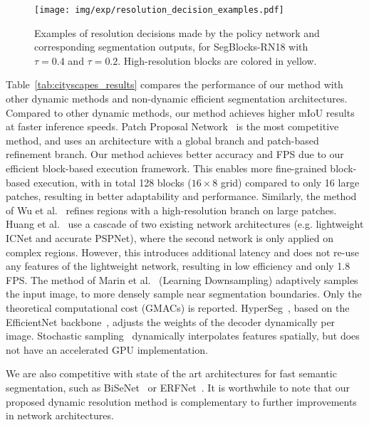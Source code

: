 \begin{figure*}[tb]
\centering
\texttt{[image: img/exp/resolution\_decision\_examples.pdf]}
\caption{Examples of resolution decisions made by the policy network and corresponding segmentation outputs, for SegBlocks-RN18 with $\tau = 0.4$ and $\tau = 0.2$. High-resolution blocks are colored in yellow. 
}
\label{fig:cityscapes_policy_examples}
\end{figure*}


Table~\ref{tab:cityscapes_results} compares the performance of our method with other dynamic methods and non-dynamic efficient segmentation architectures. Compared to other dynamic methods, our method achieves higher mIoU results at faster inference speeds. Patch Proposal Network~\cite{wu_patch_2020} is the most competitive method, and uses an architecture with a global branch and patch-based refinement branch. Our method achieves better accuracy and FPS due to our efficient block-based execution framework. This enables more fine-grained block-based execution, with in total 128 blocks ($16{\times}8$ grid) compared to only 16 large patches, resulting in better adaptability and performance. Similarly, the method of Wu et al.~\cite{wu_real-time_2017} refines regions with a high-resolution branch on large patches. Huang et al.~\cite{huang_uncertainty_2019} use a cascade of two existing network architectures (e.g. lightweight ICNet and accurate PSPNet), where the second network is only applied on complex regions. However, this introduces additional latency and does not re-use any features of the lightweight network, resulting in low efficiency and only 1.8 FPS. The method of Marin et al.~\cite{marin_efficient_2019} (Learning Downsampling) adaptively samples the input image, to more densely sample near segmentation boundaries. Only the theoretical computational cost (GMACs) is reported. HyperSeg~\cite{nirkin2021hyperseg}, based on the EfficientNet backbone~\cite{tan2019efficientnet}, adjusts the weights of the decoder dynamically per image. Stochastic sampling~\cite{xie_spatially_2020} dynamically interpolates features spatially, but does not have an accelerated GPU implementation.

We are also competitive with state of the art architectures for fast semantic segmentation, such as BiSeNet~\cite{ferrari_bisenet_2018} or ERFNet~\cite{romera_erfnet_2018}. It is worthwhile to note that our proposed dynamic resolution method is complementary to further improvements in network architectures.


